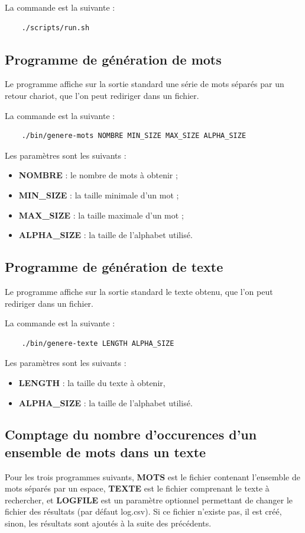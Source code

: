 La commande est la suivante :
\begin{verbatim}
    ./scripts/run.sh
\end{verbatim}

\subsection{Programme de génération de mots}
Le programme affiche sur la sortie standard une série de mots séparés par un
retour chariot, que l'on peut rediriger dans un fichier.

La commande est la suivante :
\begin{verbatim}
    ./bin/genere-mots NOMBRE MIN_SIZE MAX_SIZE ALPHA_SIZE
\end{verbatim}

Les paramètres sont les suivants :
\begin{itemize}
\item \textbf{NOMBRE} : le nombre de mots à obtenir ;
\item \textbf{MIN\_SIZE} : la taille minimale d'un mot ;
\item \textbf{MAX\_SIZE} : la taille maximale d'un mot ;
\item \textbf{ALPHA\_SIZE} : la taille de l'alphabet utilisé.
\end{itemize}

\subsection{Programme de génération de texte}
Le programme affiche sur la sortie standard le texte obtenu, que l'on peut
rediriger dans un fichier.

La commande est la suivante :
\begin{verbatim}
    ./bin/genere-texte LENGTH ALPHA_SIZE
\end{verbatim}

Les paramètres sont les suivants :
\begin{itemize}
\item \textbf{LENGTH} : la taille du texte à obtenir,
\item \textbf{ALPHA\_SIZE} : la taille de l'alphabet utilisé.
\end{itemize}

\subsection{Comptage du nombre d'occurences d'un ensemble de mots dans un texte}
Pour les trois programmes suivants, \textbf{MOTS} est le fichier contenant l'ensemble de mots
séparés par un espace, \textbf{TEXTE} est le fichier comprenant le texte à rechercher,
et \textbf{LOGFILE} est un paramètre optionnel permettant de changer le fichier des résultats
(par défaut log.csv). Si ce fichier n'existe pas, il est créé, sinon, les résultats
sont ajoutés à la suite des précédents.


